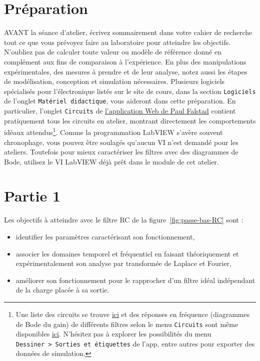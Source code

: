 \documentclass[canadien,12pt,oneside,letterpaper]{article}
\begin{document}
\section{Préparation}\label{sec:prep}
\vspace{-3ex}
AVANT la séance d'atelier, écrivez sommairement dans votre cahier de recherche tout ce que vous prévoyez faire au laboratoire pour atteindre les objectifs. N'oubliez pas de calculer toute valeur ou modèle de référence donné en complément aux fins de comparaison à l'expérience. En plus des manipulations expérimentales, des mesures à prendre et de leur analyse, notez aussi les étapes de modélisation, conception et simulation nécessaires. Plusieurs logiciels spécialisés pour l'électronique listés sur le site de cours, dans la section \texttt{Logiciels} de l'onglet \texttt{Matériel didactique}, vous aideront dans cette préparation. En particulier, l'onglet \texttt{Circuits} de \href{https://www.falstad.com/circuit/}{l'application Web de Paul Falstad} contient pratiquement tous les circuits en atelier, montrant directement les comportements idéaux attendus\footnote{Une liste des circuits se trouve \href{https://www.falstad.com/circuit/directions.html}{ici} et des réponses en fréquence (diagrammes de Bode du gain) de différents filtres selon le menu \texttt{Circuits} sont même disponibles \href{https://www.falstad.com/afilter/}{ici}. N'hésitez pas à explorer les possibilités du menu \texttt{Dessiner~>~Sorties et étiquettes} de l'app, entre autres pour exporter des données de simulation.}. Comme la programmation LabVIEW s'avère souvent chronophage, vous pouvez être soulagés qu'aucun VI n'est demandé pour les ateliers. Toutefois pour mieux caractériser les filtres avec des diagrammes de Bode, utilisez le VI LabVIEW déjà prêt dans le module de cet atelier.

\section{Partie 1}\label{sec:analyseRC}
Les objectifs à atteindre avec le filtre RC de la figure~\ref{fig:passe-bas-RC} sont :

\begin{itemize}
    \item identifier les paramètres caractérisant son fonctionnement,
    \item associer les domaines temporel et fréquentiel en faisant théoriquement et expérimentalement son analyse par transformée de Laplace et Fourier,
    \item améliorer son fonctionnement pour le rapprocher d'un filtre idéal indépendant de la charge placée à sa sortie.
\end{itemize}
\end{document}
